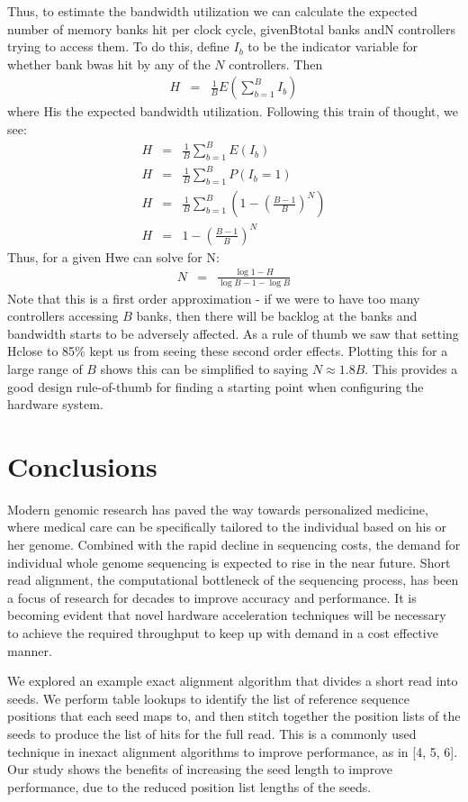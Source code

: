 \documentclass[11pt]{article}
\begin{document}
Thus, to estimate the bandwidth utilization we can calculate the expected number of memory banks hit per clock cycle, givenBtotal banks andN controllers trying to access them. To do this, define $I_b$ to be the indicator variable for whether bank bwas hit by any of the $N$ controllers. Then
\begin{eqnarray*}
H&=&\frac{1}{B}E(\sum_{b=1}^{B} I_b)
\end{eqnarray*}
where His the expected bandwidth utilization. Following this train of thought, we see:
\begin{eqnarray*}
H&=&\frac{1}{B} \sum_{b=1}^{B} E(I_b) \\
H&=&\frac{1}{B} \sum_{b=1}^{B} P(I_b = 1) \\
H&=&\frac{1}{B} \sum_{b=1}^{B} (1-(\frac{B-1}{B})^N) \\
H&=& 1-(\frac{B-1}{B})^N
\end{eqnarray*}
Thus, for a given Hwe can solve for N:
\begin{eqnarray*}
N&=&\frac{\log{1-H}}{\log{B-1}-\log{B}}
\end{eqnarray*}
Note that this is a first order approximation - if we were to have too many controllers accessing $B$ banks, then there will be backlog at the banks and bandwidth starts to be adversely affected. As a rule of thumb we saw that setting Hclose to 85\% kept us from seeing these second order effects. Plotting this for a large range of $B$ shows this can be simplified to saying $N \approx 1.8B$. This provides a good design rule-of-thumb for finding a starting point when configuring the hardware system.

\section{Conclusions}

Modern genomic research has paved the way towards personalized medicine, where medical care can be specifically tailored to the individual based on his or her genome.  Combined with the rapid decline in sequencing costs, the demand for individual whole genome sequencing is expected to rise in the near future.  Short read alignment, the computational bottleneck of the sequencing process, has been a focus of research for decades to improve accuracy and performance.  It is becoming evident that novel hardware acceleration techniques will be necessary to achieve the required throughput to keep up with demand in a cost effective manner.


	We explored an example exact alignment algorithm that divides a short read into seeds. We perform table lookups to identify the list of reference sequence positions that each seed maps to, and then stitch together the position lists of the seeds to produce the list of hits for the full read.  This is a commonly used technique in inexact alignment algorithms to improve performance, as in [4, 5, 6].  Our study shows the benefits of increasing the seed length to improve performance, due to the reduced position list lengths of the seeds.
\end{document}

